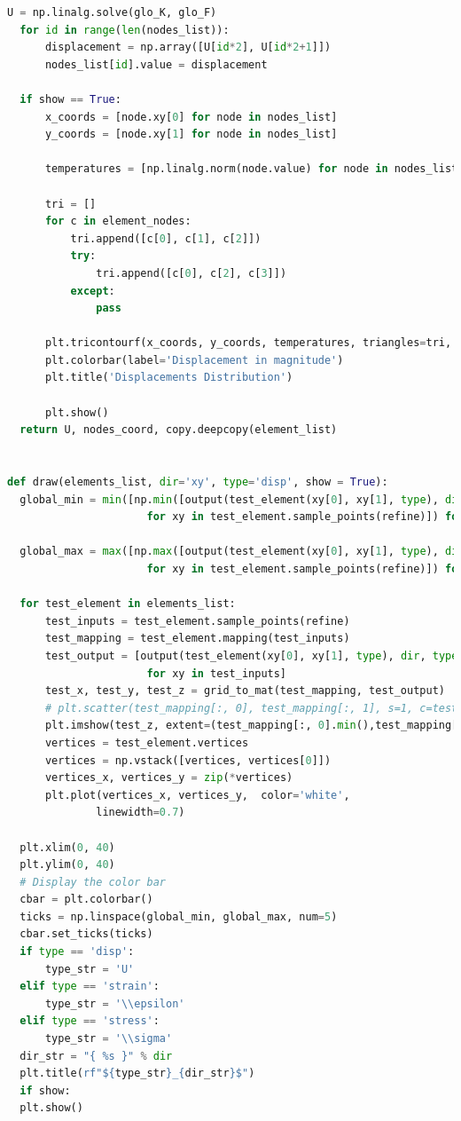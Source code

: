 \documentclass[twoside,twocolumn,10pt]{article}
\begin{document}
\begin{lstlisting}[language=Python, caption=Finite elements methods in 2D]
  U = np.linalg.solve(glo_K, glo_F)
  for id in range(len(nodes_list)):
      displacement = np.array([U[id*2], U[id*2+1]])
      nodes_list[id].value = displacement

  if show == True:
      x_coords = [node.xy[0] for node in nodes_list]
      y_coords = [node.xy[1] for node in nodes_list]

      temperatures = [np.linalg.norm(node.value) for node in nodes_list]

      tri = []
      for c in element_nodes:
          tri.append([c[0], c[1], c[2]])
          try:
              tri.append([c[0], c[2], c[3]])
          except:
              pass

      plt.tricontourf(x_coords, y_coords, temperatures, triangles=tri,  levels=15, cmap=plt.cm.jet)
      plt.colorbar(label='Displacement in magnitude')
      plt.title('Displacements Distribution')

      plt.show()
  return U, nodes_coord, copy.deepcopy(element_list)


def draw(elements_list, dir='xy', type='disp', show = True):
  global_min = min([np.min([output(test_element(xy[0], xy[1], type), dir, type)
                      for xy in test_element.sample_points(refine)]) for test_element in elements_list])

  global_max = max([np.max([output(test_element(xy[0], xy[1], type), dir, type)
                      for xy in test_element.sample_points(refine)]) for test_element in elements_list])

  for test_element in elements_list:
      test_inputs = test_element.sample_points(refine)
      test_mapping = test_element.mapping(test_inputs)
      test_output = [output(test_element(xy[0], xy[1], type), dir, type)
                      for xy in test_inputs]
      test_x, test_y, test_z = grid_to_mat(test_mapping, test_output)
      # plt.scatter(test_mapping[:, 0], test_mapping[:, 1], s=1, c=test_output)
      plt.imshow(test_z, extent=(test_mapping[:, 0].min(),test_mapping[:, 0].max(), test_mapping[:, 1].min(), test_mapping[:, 1].max()), origin='lower', aspect='auto', interpolation='none',cmap='jet', vmin=global_min, vmax=global_max)
      vertices = test_element.vertices
      vertices = np.vstack([vertices, vertices[0]])
      vertices_x, vertices_y = zip(*vertices) 
      plt.plot(vertices_x, vertices_y,  color='white',
              linewidth=0.7)  

  plt.xlim(0, 40)
  plt.ylim(0, 40)
  # Display the color bar
  cbar = plt.colorbar()
  ticks = np.linspace(global_min, global_max, num=5)
  cbar.set_ticks(ticks)
  if type == 'disp':
      type_str = 'U'
  elif type == 'strain':
      type_str = '\\epsilon'
  elif type == 'stress':
      type_str = '\\sigma'
  dir_str = "{ %s }" % dir
  plt.title(rf"${type_str}_{dir_str}$")
  if show:
  plt.show()
\end{lstlisting}
\end{document}
